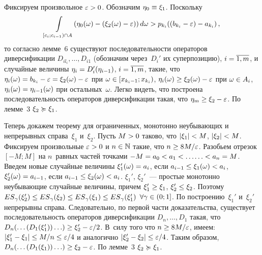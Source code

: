 \begin{multicols}{2}
Фиксируем произвольное $\eps\hm>0$. Обозначим $\eta_0 \hm\equiv \xi_1$. Поскольку
$$
\int\limits_{[c_i;c_{i-1})\cap A}(\eta_0(\omega)-(\xi_2(\omega)-\varepsilon))\,d\omega>p_{k_i}( (b_{k_i} - \varepsilon) - a_{k_i})\,,
$$
то согласно лемме~6 существуют последовательности операторов
диверсификации $D_{il_i},\ldots,D_{i1}$ (обозначим через~$D_i'$ их
суперпозицию), $i\hm=\overline{1,m}$, и случайные величины
$\eta_i\hm=D_i'(\eta_{i-1})$, $i\hm=\overline{1,m}$, такие, что
$\eta_i(\omega)\hm=b_{k_i}\hm-\eps\hm=\xi_2(\omega)\hm-\eps$ при
$\omega \hm\in [x_{k_i-1};x_{k_i})$,
$\eta_i(\omega)\hm\ge\xi_2(\omega)\hm-\eps$ при $\omega \hm\in A_i$,
$\eta_i(\omega)\hm=\eta_{i-1}(\omega)$ при остальных~$\omega$. Легко
видеть, что построена последовательность операторов диверсификации
такая, что $\eta_m\hm\ge\xi_2\hm-\eps$. По лемме~3 $\xi_2 \succcurlyeq \xi_1$.

\smallskip

\noindent
{} Теперь докажем теорему для ограниченных, монотонно
неубывающих и непрерывных справа~$\xi_1$ и~$\xi_2$. Пусть $M\hm>0$
таково, что $|\xi_1| \hm< M$, $|\xi_2|\hm<M$. Фиксируем произвольные
$\eps\hm>0$ и $n\hm\in\mathbb{N}$ такие, что $n\hm\ge 8M/\eps$.
Разобьем отрезок $[-M;M]$ на $n$~равных частей точками
$-M\hm=a_0\hm<a_1\hm<\ldots$\linebreak $\ldots<a_n\hm=M$. Введем новые случайные величины
$\xi_1'(\omega)\hm=a_i$, если $a_{i-1}\hm\le\xi_1(\omega)\hm<a_i$,
$\xi_2'(\omega)\hm=a_{i-1}$, если $a_{i-1}\hm\le\xi_2(\omega)\hm<a_i$.
$\xi_1'$, $\xi_2'$~--- простые монотонно неубывающие случайные величины,
причем $\xi_1'\hm\ge\xi_1$, $\xi_2'\hm\le\xi_2$. Поэтому
${ES}_\gamma(\xi_2')\hm\le{ES}_\gamma(\xi_2)\hm\le{ES}_\gamma(\xi_1)\hm
\le{ES}_\gamma(\xi_1')$
$\forall \gamma\hm\in(0;1]$. По построению~$\xi_1'$ и~$\xi_2'$
непрерывны справа. Следовательно, по первой части доказательства,
существует последовательность операторов диверсификации
$D_n,\ldots,D_1$ такая, что $D_n(\ldots(D_1(\xi_1'))\ldots) \hm\ge
\xi_2' \hm- \eps / 2$. В~силу того что $n\hm\ge 8M/\eps$, имеем:
$|\xi_1'\hm-\xi_1|\hm\le M/n \hm\le \eps/4$ и аналогично $|\xi_2'\hm-\xi_2|\hm\le
\eps/4$. Таким образом, $D_n(\ldots(D_1(\xi_1))\ldots) \hm\ge \xi_2 \hm- \eps $. 
По лемме~3 $\xi_2 \succcurlyeq \xi_1$.

\smallskip


\end{multicols}
